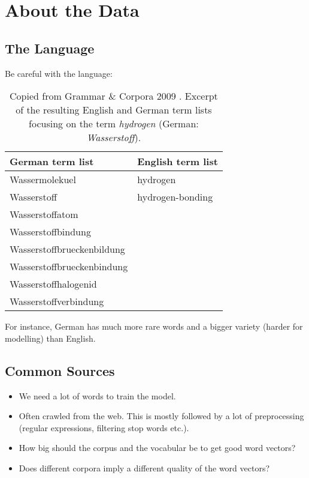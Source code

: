 \chapter{About the Data}\label{ch:data}

\section{The Language}

Be careful with the language: 

\begin{table}[!h]
\begin{center}
\begin{tabular}{ l | l }
\hline
\textbf{German term list} & \textbf{English term list} \\
\hline\hline
Wassermolekuel                & hydrogen                  \\ \hline
Wasserstoff                   & hydrogen-bonding          \\ \hline
Wasserstoffatom               &                           \\ \hline
Wasserstoffbindung            &                           \\ \hline
Wasserstoffbrueckenbildung    &                           \\ \hline
Wasserstoffbrueckenbindung    &                           \\ \hline
Wasserstoffhalogenid          &                           \\ \hline
Wasserstoffverbindung         &                           \\ \hline
\end{tabular}
\caption[Term list comparison between German and English]{
         Copied from Grammar \& Corpora 2009 \cite{konopka2011grammar}. Excerpt of 
         the resulting English and German term lists focusing on the term 
         \textit{hydrogen} (German: \textit{Wasserstoff}).}
\label{tab:ger-vs-eng-terms}
\end{center}
\end{table}

For instance, German has much more rare words and a bigger variety (harder 
for modelling) than English.

\section{Common Sources}

\begin{itemize}
  \item 
    We need a lot of words to train the model.

  \item 
    Often crawled from the web. This is mostly followed by a lot of 
    preprocessing (regular expressions, filtering stop words etc.).
  
  \item 
    How big should the corpus and the vocabular be to get good word vectors?
  
  \item 
    Does different corpora imply a different quality of the word vectors?
\end{itemize}

